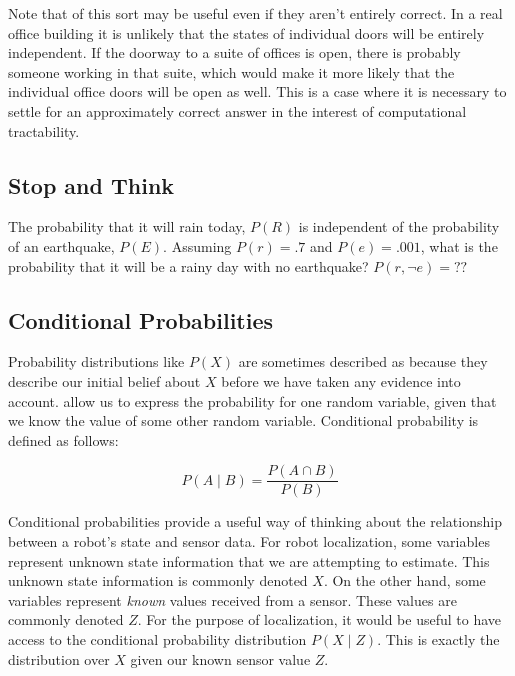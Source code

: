 Note that  of this sort may be useful
even if they aren't entirely correct.  In a real office building it is
unlikely that the states of individual doors will be entirely
independent. If the doorway to a suite of offices is open, there is
probably someone working in that suite, which would make it more
likely that the individual office doors will be open as well. This is
a case where it is necessary to settle for an approximately correct
answer in the interest of computational tractability.


\subsection*{Stop and Think}

\begin{exercise}
The probability that it will rain today, $P(R)$ is independent of the
probability of an earthquake, $P(E)$. Assuming $P(r) = .7$ and $P(e) =
.001$, what is the probability that it will be a rainy day with no
earthquake? $P(r, \lnot e) = ??$
\end{exercise}


\subsection{Conditional Probabilities}

Probability distributions like $P(X)$ are sometimes described as
 because they describe our initial belief
about $X$ before we have taken any evidence into
account.  allow us to express the
probability for one random variable, given that we know the value of
some other random variable.  Conditional probability is defined as
follows:

\begin{equation} \label{eq:conditional}
  P(A \mid B) = \frac{P(A \cap B)}{P(B)}
\end{equation}

Conditional probabilities provide a useful way of thinking about the
relationship between a robot's state and sensor data.  For robot
localization, some variables represent unknown state information that
we are attempting to estimate.  This unknown state information is
commonly denoted $X$.  On the other hand, some variables represent
\emph{known} values received from a sensor.  These values are commonly
denoted $Z$. For the purpose of localization, it would be useful to
have access to the conditional probability distribution $P(X \mid Z)$.
This is exactly the distribution over $X$ given our known sensor value
$Z$.

